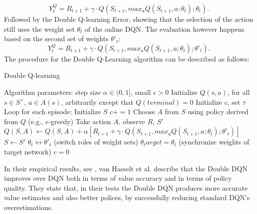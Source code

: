 \documentclass[12pt,a4paper]{article}
\begin{document}
\begin{equation}
    \label{eq:q_target_untangled}
    Y_t^Q = R_{t+1} + \gamma \cdot Q(S_{t+1}, max_a Q(S_{t+1}, a;  \theta_t); \theta_t).
\end{equation}
Followed by the Double Q-learning Error, showing that the selection of the action still uses the weight set $\theta_t$ of the online DQN. The evaluation however happens based on the second set of weights $\theta'_t$: 
\begin{equation}
    \label{eq:double_q_target}
    Y_t^Q = R_{t+1} + \gamma \cdot Q(S_{t+1}, max_a Q(S_{t+1}, a;  \theta_t); \theta'_t).
\end{equation}
The procedure for the Double Q-Learning algorithm can be described as follows:
\begin{algorithm}
    \caption{Double Q-learning}
    \begin{algorithmic}
    \State Algorithm parameters: step size $\alpha \in (0, 1]$, small  $\epsilon > 0$
    \State Initialize $Q(s,a)$, for all $s\in S^+$, $a\in A(s)$, arbitrarily except that $Q(terminal)=0$
    \State Initialize $c$, set $\tau$
    \State Loop for each episode:
        \State Initialize $S$
        \State $c += 1$
            \State Choose $A$ from $S$ using policy derived from $Q$ (e.g., $\epsilon$-greedy)
            \State Take action $A$, observe $R$, $S'$
            \State $Q(S, A) \leftarrow Q(S, A) + \alpha [R_{t+1}+\gamma \cdot Q(S_{t+1}, max_a Q(S_{t+1}, a;  \theta_t); \theta'_t)]$
            \State $S \leftarrow S'$
            \State $\theta_t \leftrightarrow \theta'_t$ (switch roles of weight sets)
        \EndFor
            \State $\theta_target = \theta_t $ (synchronize weights of target network)
            \State $c = 0$
        \EndIf
    \EndWhile
    \end{algorithmic}
\end{algorithm}
In their empirical results, see \cite{VanHasselt2015}, van Hasselt et al. describe that the Double DQN improves over DQN both in terms of value accuracy and in terms of policy quality. They state that, in their tests the Double DQN produces more accurate value estimates and also better polices, by successfully reducing standard DQN's overestimations.
\newpage
\end{document}
